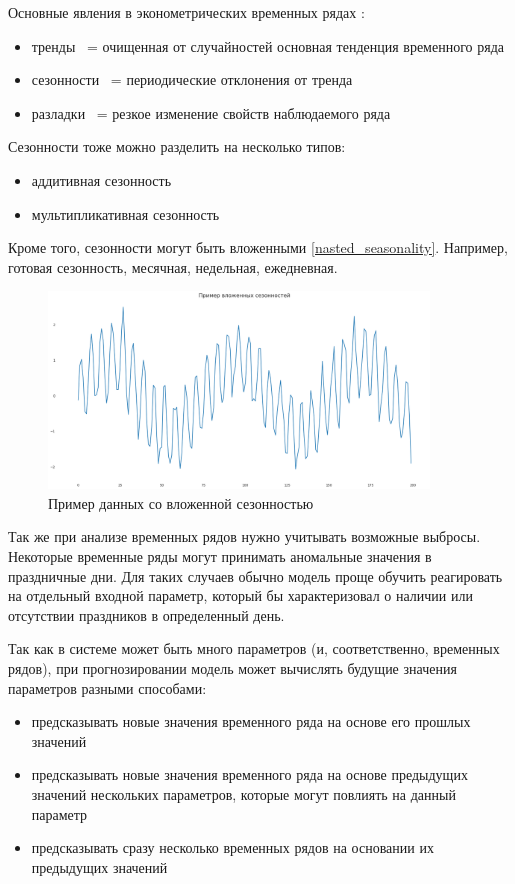 Основные явления в эконометрических временных рядах \cite{voron}:
\begin{itemize}
	\item тренды ~= очищенная от случайностей основная тенденция временного ряда
	\item сезонности ~= периодические отклонения от тренда
	\item разладки ~= резкое изменение свойств наблюдаемого ряда
\end{itemize}

Сезонности тоже можно разделить на несколько типов:

\begin{itemize}
	\item аддитивная сезонность
	\item мультипликативная сезонность
\end{itemize}

Кроме того, сезонности могут быть вложенными \ref{nasted_seasonality}. Например, готовая сезонность, месячная,
недельная, ежедневная.

\begin{figure}
	\centering
	\includegraphics[width=0.9\textwidth]{./img/nasted_seasonality.png}
	\caption{Пример данных со вложенной сезонностью}
	\label{pic:nasted_seasonality}
\end{figure}


Так же при анализе временных рядов нужно учитывать возможные выбросы.
Некоторые временные ряды могут принимать аномальные значения в праздничные дни.
Для таких случаев обычно модель проще обучить реагировать на отдельный входной
параметр, который бы характеризовал о наличии или отсутствии праздников в
определенный день.

Так как в системе может быть много параметров (и, соответственно, временных рядов),
при прогнозировании модель может вычислять будущие значения параметров разными способами:

\begin{itemize}
	\item предсказывать новые значения временного ряда на основе его прошлых значений
	\item предсказывать новые значения временного ряда на основе предыдущих значений
	нескольких параметров, которые могут повлиять на данный параметр
	\item предсказывать сразу несколько временных рядов на основании их предыдущих значений
\end{itemize}

